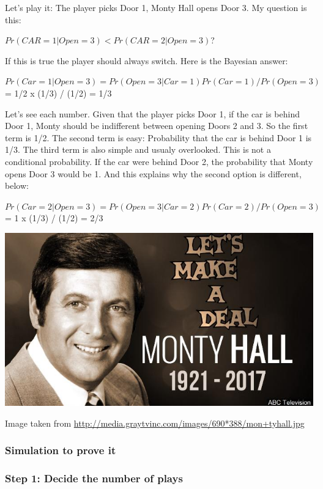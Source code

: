 \documentclass[
]{book}
\theoremstyle{definition}
\theoremstyle{definition}
\theoremstyle{definition}
\theoremstyle{definition}
\theoremstyle{remark}
\begin{document}
Let's play it: The player picks Door 1, Monty Hall opens Door 3. My question is this:

\(Pr(CAR = 1|Open = 3) < Pr(CAR = 2|Open = 3)\)?

If this is true the player should always switch. Here is the Bayesian answer:

\(Pr(Car=1|Open=3) = Pr(Open=3|Car=1)Pr(Car=1)/Pr(Open=3)\) = 1/2 x (1/3) / (1/2) = 1/3

Let's see each number. Given that the player picks Door 1, if the car is behind Door 1, Monty should be indifferent between opening Doors 2 and 3. So the first term is 1/2. The second term is easy: Probability that the car is behind Door 1 is 1/3. The third term is also simple and usualy overlooked. This is not a conditional probability. If the car were behind Door 2, the probability that Monty opens Door 3 would be 1. And this explains why the second option is different, below:

\(Pr(Car=2|Open=3) = Pr(Open=3|Car=2)Pr(Car=2)/Pr(Open=3)\) = 1 x (1/3) / (1/2) = 2/3

\includegraphics[width=9.58in]{png/montyhall}

Image taken from \url{http://media.graytvinc.com/images/690*388/mon+tyhall.jpg}

\hypertarget{simulation-to-prove-it}{%
\subsubsection*{Simulation to prove it}\label{simulation-to-prove-it}}

\hypertarget{step-1-decide-the-number-of-plays}{%
\subsubsection*{Step 1: Decide the number of plays}\label{step-1-decide-the-number-of-plays}}
\end{document}
